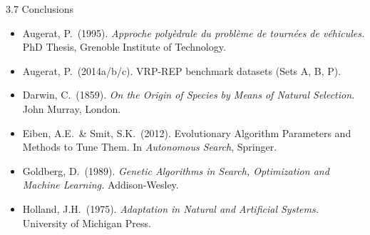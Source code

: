 \documentclass[aspectratio=169,10pt]{beamer}
\begin{document}
\begin{frame}[allowframebreaks]{3.7 Conclusions}
  \begin{itemize}
    \item Augerat, P.\ (1995). \emph{Approche poly\`edrale du probl\`eme de tourn\'ees de
          v\'ehicules.} PhD Thesis, Grenoble Institute of Technology.
    \item Augerat, P.\ (2014a/b/c). VRP-REP benchmark datasets (Sets A, B, P).
    \item Darwin, C.\ (1859). \emph{On the Origin of Species by Means of Natural Selection.}
          John Murray, London.
    \item Eiben, A.E.\ \& Smit, S.K.\ (2012). Evolutionary Algorithm Parameters and Methods
          to Tune Them. In \emph{Autonomous Search}, Springer.
    \item Goldberg, D.\ (1989). \emph{Genetic Algorithms in Search, Optimization and
          Machine Learning.} Addison-Wesley.
    \item Holland, J.H.\ (1975). \emph{Adaptation in Natural and Artificial Systems.}
          University of Michigan Press.
  \end{itemize}

\end{frame}
\end{document}
